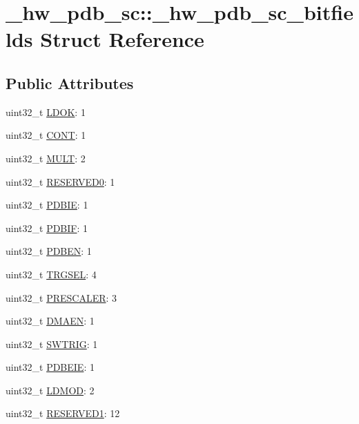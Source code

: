 \hypertarget{struct__hw__pdb__sc_1_1__hw__pdb__sc__bitfields}{}\section{\+\_\+hw\+\_\+pdb\+\_\+sc\+:\+:\+\_\+hw\+\_\+pdb\+\_\+sc\+\_\+bitfields Struct Reference}
\label{struct__hw__pdb__sc_1_1__hw__pdb__sc__bitfields}
\subsection*{Public Attributes}
\begin{DoxyCompactItemize}
\item 
uint32\+\_\+t \hyperlink{struct__hw__pdb__sc_1_1__hw__pdb__sc__bitfields_ac30d5823724a438162afaf3cb710cdda}{L\+D\+OK}\+: 1
\item 
uint32\+\_\+t \hyperlink{struct__hw__pdb__sc_1_1__hw__pdb__sc__bitfields_ac9e0a68cf5e9c23d8601338bca26c923}{C\+O\+NT}\+: 1
\item 
uint32\+\_\+t \hyperlink{struct__hw__pdb__sc_1_1__hw__pdb__sc__bitfields_ae81b37393795ab08d606b18edc27a550}{M\+U\+LT}\+: 2
\item 
uint32\+\_\+t \hyperlink{struct__hw__pdb__sc_1_1__hw__pdb__sc__bitfields_a9c3c5afd7bf4ca2cf28e7bf6a199b1cf}{R\+E\+S\+E\+R\+V\+E\+D0}\+: 1
\item 
uint32\+\_\+t \hyperlink{struct__hw__pdb__sc_1_1__hw__pdb__sc__bitfields_aff2fd5298b32b0348278bdcb499bb8bb}{P\+D\+B\+IE}\+: 1
\item 
uint32\+\_\+t \hyperlink{struct__hw__pdb__sc_1_1__hw__pdb__sc__bitfields_a59eefcf322ab773baab7d164bb00cea0}{P\+D\+B\+IF}\+: 1
\item 
uint32\+\_\+t \hyperlink{struct__hw__pdb__sc_1_1__hw__pdb__sc__bitfields_a128080fee119478363066c8224e25988}{P\+D\+B\+EN}\+: 1
\item 
uint32\+\_\+t \hyperlink{struct__hw__pdb__sc_1_1__hw__pdb__sc__bitfields_acf729a36d7964081a55b73e95d71c062}{T\+R\+G\+S\+EL}\+: 4
\item 
uint32\+\_\+t \hyperlink{struct__hw__pdb__sc_1_1__hw__pdb__sc__bitfields_a9433569efe0e466c6697ec0cc531f140}{P\+R\+E\+S\+C\+A\+L\+ER}\+: 3
\item 
uint32\+\_\+t \hyperlink{struct__hw__pdb__sc_1_1__hw__pdb__sc__bitfields_af486c5de7ef0acae09588b7a688f8d3c}{D\+M\+A\+EN}\+: 1
\item 
uint32\+\_\+t \hyperlink{struct__hw__pdb__sc_1_1__hw__pdb__sc__bitfields_a944787b0230f8b0c4ba78cb66d7bbc58}{S\+W\+T\+R\+IG}\+: 1
\item 
uint32\+\_\+t \hyperlink{struct__hw__pdb__sc_1_1__hw__pdb__sc__bitfields_a34840d5036a5bae6da343ee29a099c16}{P\+D\+B\+E\+IE}\+: 1
\item 
uint32\+\_\+t \hyperlink{struct__hw__pdb__sc_1_1__hw__pdb__sc__bitfields_a7ea95cb2d77afa4ac30cc6eb56b69c1e}{L\+D\+M\+OD}\+: 2
\item 
uint32\+\_\+t \hyperlink{struct__hw__pdb__sc_1_1__hw__pdb__sc__bitfields_a997e2b820941be9939324e0fe8640deb}{R\+E\+S\+E\+R\+V\+E\+D1}\+: 12
\end{DoxyCompactItemize}


